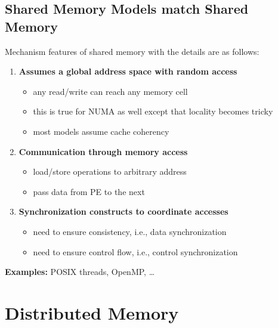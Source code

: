 \documentclass[12pt, a4paper]{report}
\begin{document}
\subsection{Shared Memory Models match Shared Memory}
Mechanism features of shared memory with the details are as follows:
\begin{enumerate}[label={\bfseries (\Alph*)}]
    \item {\bfseries Assumes a global address space with random access}
        \begin{itemize}
            \item any read/write can reach any memory cell 
            \item this is true for NUMA as well except that locality becomes tricky
            \item most models assume cache coherency
        \end{itemize}

    \item {\bfseries Communication through memory access}
        \begin{itemize}
            \item load/store operations to arbitrary address
            \item pass data from PE to the next
        \end{itemize}
    
    \item {\bfseries Synchronization constructs to coordinate accesses}
        \begin{itemize}
            \item need to ensure consistency, i.e., data synchronization
            \item need to ensure control flow, i.e., control synchronization 
        \end{itemize}
\end{enumerate}

{\bfseries Examples:} POSIX threads, OpenMP, \ldots

\section{Distributed Memory}
\end{document}
